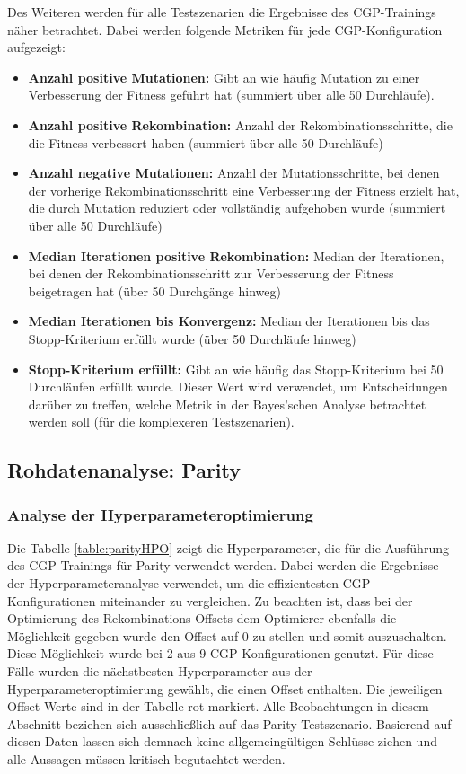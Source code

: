 Des Weiteren werden für alle Testszenarien die Ergebnisse des CGP-Trainings näher betrachtet.
Dabei werden folgende Metriken für jede CGP-Konfiguration aufgezeigt:
\begin{itemize}
	\item \textbf{Anzahl positive Mutationen:} Gibt an wie häufig Mutation zu einer Verbesserung der Fitness geführt hat (summiert über alle 50 Durchläufe).
	\item \textbf{Anzahl positive Rekombination:} Anzahl der Rekombinationsschritte, die die Fitness verbessert haben (summiert über alle 50 Durchläufe)
	\item \textbf{Anzahl negative Mutationen:} Anzahl der Mutationsschritte, bei denen der vorherige Rekombinationsschritt eine Verbesserung der Fitness erzielt hat, die durch Mutation reduziert oder vollständig aufgehoben wurde (summiert über alle 50 Durchläufe)
	\item \textbf{Median Iterationen positive Rekombination:} Median der Iterationen, bei denen der Rekombinationsschritt zur Verbesserung der Fitness beigetragen hat (über 50 Durchgänge hinweg)
	\item \textbf{Median Iterationen bis Konvergenz:} Median der Iterationen bis das Stopp-Kri\-te\-ri\-um erfüllt wurde (über 50 Durchläufe hinweg)
	\item \textbf{Stopp-Kriterium erfüllt:} Gibt an wie häufig das Stopp-Kriterium bei 50 Durchläufen erfüllt wurde. Dieser Wert wird verwendet, um Entscheidungen darüber zu treffen, welche Metrik in der Bayes'schen Analyse betrachtet werden soll (für die komplexeren Testszenarien).
\end{itemize}

\subsection{Rohdatenanalyse: Parity}
\label{subsec:rohdatenParity}
\subsubsection{Analyse der Hyperparameteroptimierung}

Die Tabelle \ref{table:parityHPO} zeigt die Hyperparameter, die für die Ausführung des CGP-Trainings für Parity verwendet werden.
Dabei werden die Ergebnisse der Hyperparameteranalyse verwendet, um die effizientesten CGP-Konfigurationen miteinander zu vergleichen.
Zu beachten ist, dass bei der Optimierung des Rekombinations-Offsets dem Optimierer ebenfalls die Möglichkeit gegeben wurde den Offset auf 0 zu stellen und somit auszuschalten.
Diese Möglichkeit wurde bei 2 aus 9 CGP-Konfigurationen genutzt.
Für diese Fälle wurden die nächstbesten Hyperparameter aus der Hyperparameteroptimierung gewählt, die einen Offset enthalten.
Die jeweiligen Offset-Werte sind in der Tabelle rot markiert.
Alle Beobachtungen in diesem Abschnitt beziehen sich ausschließlich auf das Parity-Testszenario.
Basierend auf diesen Daten lassen sich demnach keine allgemeingültigen Schlüsse ziehen und alle Aussagen müssen kritisch begutachtet werden.
